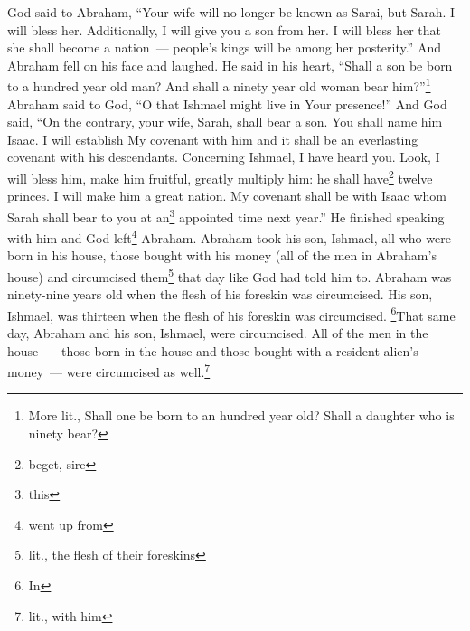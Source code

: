 \begin{enumerate*}[mode=unboxed]
     God said to Abraham, ``Your wife will no longer be known as Sarai, but Sarah.%
     I will bless her. Additionally, I will give you a son from her. I will bless her that she shall become a nation~--- people's kings will be among her posterity.''%
     And Abraham fell on his face and laughed. He said in his heart, ``Shall a son be born to a hundred year old man? And shall a ninety year old woman bear him?''\footnote{More lit., Shall one be born to an hundred year old? Shall a daughter who is ninety bear?}%
     Abraham said to God, ``O that Ishmael might live in Your presence!''%
     And God said, ``On the contrary, your wife, Sarah, shall bear a son. You shall name him Isaac. I will establish My covenant with him and it shall be an everlasting covenant with his descendants.%
     Concerning Ishmael, I have heard you. Look, I will bless him, make him fruitful, greatly multiply him: he shall have\footnote{beget, sire} twelve princes. I will make him a great nation.%
     My covenant shall be with Isaac whom Sarah shall bear to you at an\footnote{this} appointed time next year.''%
     He finished speaking with him and God left\footnote{went up from} Abraham.%
     Abraham took his son, Ishmael, all who were born in his house, those bought with his money (all of the men in Abraham's house) and circumcised them\footnote{lit., the flesh of their foreskins} that day like God had told him to.%
     Abraham was ninety-nine years old when the flesh of his foreskin was circumcised.%
     His son, Ishmael, was thirteen when the flesh of his foreskin was circumcised.%
     \footnote{In}That same day, Abraham and his son, Ishmael, were circumcised.%
     All of the men in the house~--- those born in the house and those bought with a resident alien's money~--- were circumcised as well.\footnote{lit., with him}%
\end{enumerate*}
